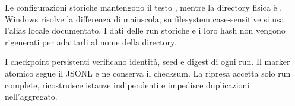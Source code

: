 Le configurazioni storiche mantengono il testo , mentre la directory fisica è . Windows risolve la differenza di maiuscola; su filesystem case-sensitive si usa l'alias locale documentato. I dati delle run storiche e i loro hash non vengono rigenerati per adattarli al nome della directory.

I checkpoint persistenti verificano identità, seed e digest di ogni run. Il marker atomico segue il JSONL e ne conserva il checksum. La ripresa accetta solo run complete, ricostruisce istanze indipendenti e impedisce duplicazioni nell'aggregato.

\begin{table}[htbp]\centering\scriptsize

\caption{Coverage della validation principale per le configurazioni congelate, con cutoff espliciti.}
\end{table}

\clearpage\small

\normalsize
